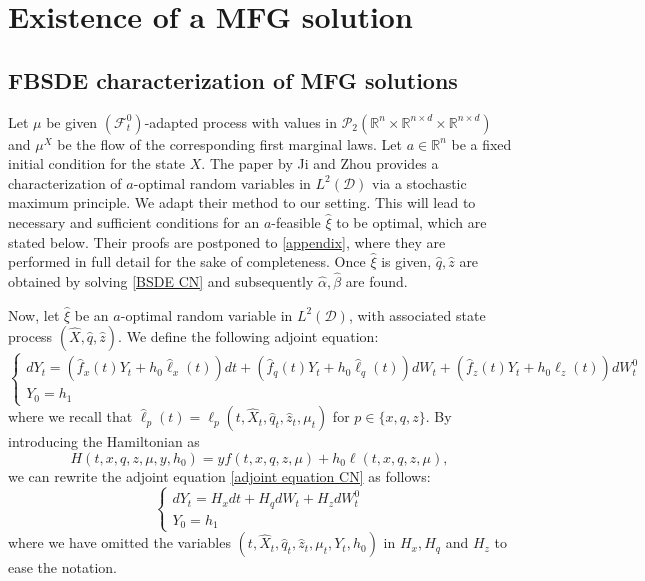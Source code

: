 \documentclass[11pt,a4paper]{article}
\begin{document}
\section{Existence of a MFG solution}
\subsection{FBSDE characterization of MFG solutions}

Let $\mu$ be given $(\mathcal F_t^0)$-adapted process with values in $\mathcal P_2(\mathbb R^n \times \mathbb R^{n\times d}\times \mathbb R^{n\times d})$ and $\mu^X$ be the flow of the corresponding first marginal laws. Let $a\in \mathbb R^n$ be a fixed initial condition for the state $X$. The paper by Ji and Zhou \cite{Ji Zhou} provides a characterization of $a$-optimal random variables in $L^2 (\mathcal D)$ via a stochastic maximum principle. We adapt their method to our setting. This will lead to necessary and sufficient conditions for an $a$-feasible $\hat \xi$ to be optimal, which are stated below. Their proofs are postponed to \ref{appendix}, where they are performed in full detail for the sake of completeness. Once $\hat \xi$ is given, $\hat q, \hat z$ are obtained by solving \eqref{BSDE CN} and subsequently $\hat \alpha, \hat \beta$ are found. 

Now, let $\hat \xi$ be an $a$-optimal random variable in $L^2 (\mathcal D)$, with associated state process $(\hat X,\hat q,\hat z)$. 
We define the following adjoint equation:
\begin{equation}
\label{adjoint equation CN}
    \begin{cases}
        dY_t=\left(\hat f_x(t)Y_t+h_0 \hat \ell_x(t)\right)dt+\left(\hat f_q(t) Y_t+h_0 \hat \ell_q(t) \right)dW_t+\left(\hat f_z(t)Y_t+h_0 \hat\ell_z(t)\right)dW_t^0\\
        Y_0=h_1
    \end{cases}
\end{equation}
where we recall that $\hat \ell_{p}(t)=\ell_{p}(t,\hat X_t, \hat q_t, \hat z_t, \mu_t)$ for $p\in \{x,q,z\}$.
By introducing the Hamiltonian as 
$$H(t, x, q, z, \mu,  y, h_0)=  y f(t, x, q, z, \mu)+h_0 \ell(t, x, q, z, \mu),$$
we can rewrite the adjoint equation \eqref{adjoint equation CN} as follows: 
\begin{equation*}
    \begin{cases}
      dY_t=H_xdt+H_qdW_t+H_zdW_t^0\\
        Y_0=h_1  
    \end{cases}
\end{equation*}
where we have omitted the variables $(t, \hat X_t,  \hat q_t, \hat z_t,  \mu_t, Y_t,h_0)$ in $H_x,H_q$ and $H_z$ to ease the notation. 
\end{document}

